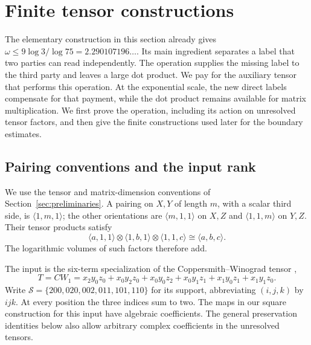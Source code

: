 \section{Finite tensor constructions}
\label{alg:section}

The elementary construction in this section already gives
\(\omega\leq 9\log 3/\log 75=2.290107196\ldots\).
Its main ingredient separates a label that two parties can read independently.
The operation supplies the missing label to the third party and leaves a
large dot product.  We pay for the auxiliary tensor that performs this
operation.  At the exponential scale, the new direct labels compensate for
that payment, while the dot product remains available for matrix
multiplication.  We first prove the operation, including its action on
unresolved tensor factors, and then give the finite constructions used later
for the boundary estimates.

\subsection{Pairing conventions and the input rank}
\label{alg:conventions}

We use the tensor and matrix-dimension conventions of
Section~\ref{sec:preliminaries}.
A pairing on \(X,Y\) of length \(m\), with a scalar third side, is
\(\langle1,m,1\rangle\); the other orientations are
\(\langle m,1,1\rangle\) on \(X,Z\) and
\(\langle1,1,m\rangle\) on \(Y,Z\).
Their tensor products satisfy
\begin{equation}
 \langle a,1,1\rangle\otimes\langle1,b,1\rangle
 \otimes\langle1,1,c\rangle\cong\langle a,b,c\rangle.
 \label{alg:pairing-product}
\end{equation}
The logarithmic volumes of such factors therefore add.

The input is the six-term specialization of the Coppersmith--Winograd
tensor \citep[Section~7, equation~(10)]{cw},
\begin{equation}
 T=CW_1=x_2y_0z_0+x_0y_2z_0+x_0y_0z_2
        +x_0y_1z_1+x_1y_0z_1+x_1y_1z_0.
 \label{alg:cw}
\end{equation}
Write
\(\mathcal S=\{200,020,002,011,101,110\}\) for its support, abbreviating
\((i,j,k)\) by \(ijk\).  At every position the three indices sum to two.
The maps in our square construction for this input have algebraic
coefficients.  The general preservation identities below also allow
arbitrary complex coefficients in the unresolved tensors.

